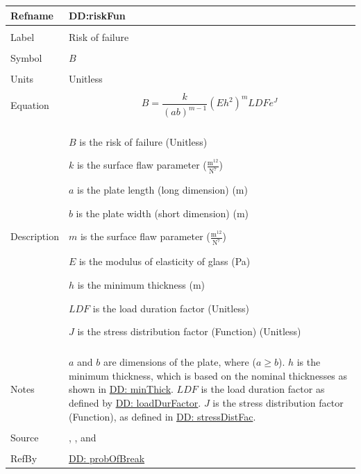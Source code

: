 \documentclass[12pt]{article}
\begin{document}
\noindent \begin{minipage}{\textwidth}
\begin{tabular}{p{} p{}}
\toprule \textbf{Refname} & \textbf{DD:riskFun}
\label{DD:riskFun}
\\ \midrule \\
Label & Risk of failure
\\ \midrule \\
Symbol & $B$
\\ \midrule \\
Units & Unitless
\\ \midrule \\
Equation & \begin{displaymath}
           B=\frac{k}{\left(a b\right)^{m-1}} \left(E h^{2}\right)^{m} LDF e^{J}
           \end{displaymath}
\\ \midrule \\
Description & \begin{symbDescription}
              \item{$B$ is the risk of failure (Unitless)}
              \item{$k$ is the surface flaw parameter ($\frac{\text{m}^{12}}{\text{N}^{7}}$)}
              \item{$a$ is the plate length (long dimension) (m)}
              \item{$b$ is the plate width (short dimension) (m)}
              \item{$m$ is the surface flaw parameter ($\frac{\text{m}^{12}}{\text{N}^{7}}$)}
              \item{$E$ is the modulus of elasticity of glass (Pa)}
              \item{$h$ is the minimum thickness (m)}
              \item{$LDF$ is the load duration factor (Unitless)}
              \item{$J$ is the stress distribution factor (Function) (Unitless)}
              \end{symbDescription}
\\ \midrule \\
Notes & $a$ and $b$ are dimensions of the plate, where ($a\geq{}b$).
        $h$ is the minimum thickness, which is based on the nominal thicknesses as shown in \hyperref[DD:minThick]{DD: minThick}.
        $LDF$ is the load duration factor as defined by \hyperref[DD:loadDurFactor]{DD: loadDurFactor}.
        $J$ is the stress distribution factor (Function), as defined in \hyperref[DD:stressDistFac]{DD: stressDistFac}.
\\ \midrule \\
Source & \cite{astm2009}, \cite[(Eqs. 4-5)]{beasonEtAl1998}, and \cite[(Eq. 14)]{campidelli}
\\ \midrule \\
RefBy & \hyperref[DD:probOfBreak]{DD: probOfBreak}
\\ \bottomrule \end{tabular}
\end{minipage}
\par~
\end{document}
